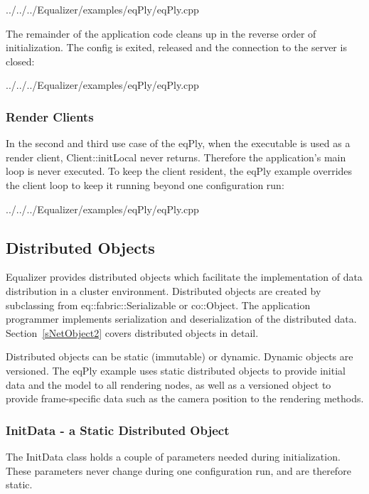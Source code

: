 \documentclass[10pt,a4]{scrartcl}
\newcommand{\sref}[1]{Section~\ref{#1}}
\begin{document}
{\footnotesize
  {../../../Equalizer/examples/eqPly/eqPly.cpp}}

The remainder of the application code cleans up in the reverse order of
initialization. The config is exited, released and the connection to the server
is closed:

{\footnotesize
  {../../../Equalizer/examples/eqPly/eqPly.cpp}}

\subsubsection{Render Clients}

In the second and third use case of the \textsf{eqPly}, when the
executable is used as a render client, \textsf{Client::initLocal} never
returns. Therefore the application's main loop is never executed. To
keep the client resident, the \textsf{eqPly} example overrides the
client loop to keep it running beyond one configuration run:

{\footnotesize
  {../../../Equalizer/examples/eqPly/eqPly.cpp}}


\subsection{\label{sNetObject}Distributed Objects}

Equalizer provides distributed objects which facilitate the implementation of
data distribution in a cluster environment. Distributed objects are created by
subclassing from \textsf{eq::fabric::Serializable} or \textsf{co::Object}. The
application programmer implements serialization and deserialization of the
distributed data. \sref{sNetObject2} covers distributed objects in detail.

Distributed objects can be static (immutable) or dynamic. Dynamic objects are
versioned. The \textsf{eqPly} example uses static distributed objects to provide
initial data and the model to all rendering nodes, as well as a versioned object
to provide frame-specific data such as the camera position to the rendering
methods.

\subsubsection{\label{sInitData}InitData - a Static Distributed Object}

The \textsf{InitData} class holds a couple of parameters needed during
initialization. These parameters never change during one configuration
run, and are therefore static.
\end{document}

